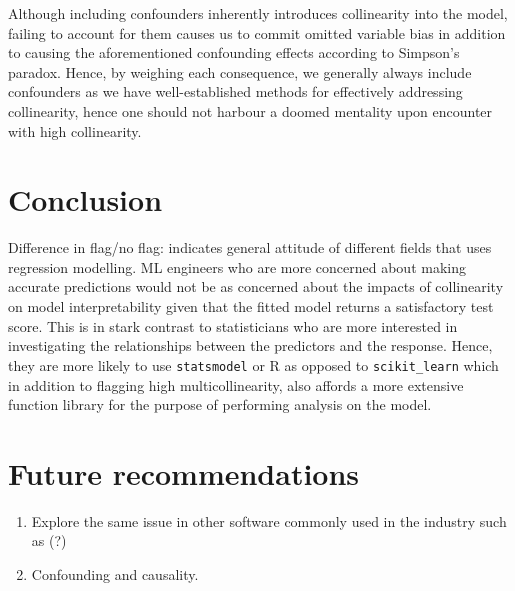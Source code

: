 \documentclass[12pt]{article}
\begin{document}
	Although including confounders inherently introduces collinearity into the model, failing to account for them causes us to commit omitted variable bias in addition to causing the aforementioned confounding effects according to Simpson's paradox. Hence, by weighing each consequence, we generally always include confounders as we have well-established methods for effectively addressing collinearity, hence one should not harbour a doomed mentality upon encounter with high collinearity.
	
	\section{Conclusion}
	
	Difference in flag/no flag: indicates general attitude of different fields that uses regression modelling. ML engineers who are more concerned about making accurate predictions would not be as concerned about the impacts of collinearity on model interpretability given that the fitted model returns a satisfactory test score. This is in stark contrast to statisticians who are more interested in investigating the relationships between the predictors and the response. Hence, they are more likely to use \texttt{statsmodel} or R as opposed to \texttt{scikit\_learn} which in addition to flagging high multicollinearity, also affords a more extensive function library for the purpose of performing analysis on the model.
	
	\section{Future recommendations}
	\begin{enumerate}
		\item Explore the same issue in other software commonly used in the industry such as (?)
		\item Confounding and causality.
	\end{enumerate}
\end{document}
